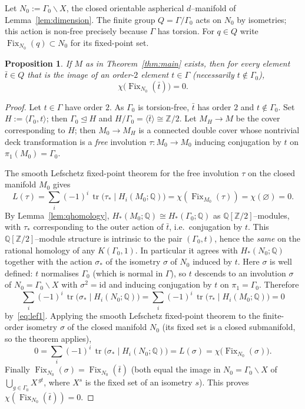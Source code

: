 \documentclass[12pt]{article}
\newcommand{\bQ}{\mathbb{Q}}
\newcommand{\bZ}{\mathbb{Z}}
\newcommand{\Fix}{\operatorname{Fix}}
\DeclareMathOperator{\tr}{tr}
\newtheorem{proposition}{Proposition}
\theoremstyle{definition}
\begin{document}
Let $N_0:=\Gamma_0\backslash X$, the closed orientable aspherical $d$--manifold of
Lemma~\ref{lem:dimension}.  The finite group $Q=\Gamma/\Gamma_0$ acts on $N_0$ by
isometries; this action is non-free precisely because $\Gamma$ has torsion.  For
$q\in Q$ write $\Fix_{N_0}(q)\subset N_0$ for its fixed-point set.

\begin{proposition}\label{prop:lefschetz}
If $M$ as in Theorem~\ref{thm:main} exists, then for every element $\bar t\in Q$
that is the image of an order-$2$ element $t\in\Gamma$ (necessarily
$t\notin\Gamma_0$),
\[
   \chi\bigl(\Fix_{N_0}(\bar t)\bigr)=0 .
\]
\end{proposition}

\begin{proof}
Let $t\in\Gamma$ have order $2$.  As $\Gamma_0$ is torsion-free, $\bar t$ has
order $2$ and $t\notin\Gamma_0$.  Set $H:=\langle\Gamma_0,t\rangle$; then
$\Gamma_0\trianglelefteq H$ and $H/\Gamma_0=\langle\bar t\rangle\cong\bZ/2$.  Let
$M_H\to M$ be the cover corresponding to $H$; then $M_0\to M_H$ is a connected
double cover whose nontrivial deck transformation is a \emph{free} involution
$\tau\colon M_0\to M_0$ inducing conjugation by $t$ on $\pi_1(M_0)=\Gamma_0$.

The smooth Lefschetz fixed-point theorem for the free involution $\tau$ on the
closed manifold $M_0$ gives
\begin{equation}\label{eq:lef1}
   L(\tau)=\sum_i(-1)^i\,\tr\bigl(\tau_*\mid H_i(M_0;\bQ)\bigr)
          =\chi(\Fix_{M_0}(\tau))=\chi(\varnothing)=0 .
\end{equation}
By Lemma~\ref{lem:qhomology}, $H_*(M_0;\bQ)\cong H_*(\Gamma_0;\bQ)$ as
$\bQ[\bZ/2]$--modules, with $\tau_*$ corresponding to the outer action of
$\bar t$, i.e.\ conjugation by $t$.  This $\bQ[\bZ/2]$--module structure is
intrinsic to the pair $(\Gamma_0,t)$, hence the \emph{same} on the rational
homology of any $K(\Gamma_0,1)$.  In particular it agrees with $H_*(N_0;\bQ)$
together with the action $\sigma_*$ of the isometry $\sigma$ of $N_0$ induced by
$t$.  Here $\sigma$ is well defined: $t$ normalises $\Gamma_0$ (which is normal in
$\Gamma$), so $t$ descends to an involution $\sigma$ of $N_0=\Gamma_0\backslash X$
with $\sigma^2=\mathrm{id}$ and inducing conjugation by $t$ on $\pi_1=\Gamma_0$.
Therefore
\[
   \sum_i(-1)^i\,\tr\bigl(\sigma_*\mid H_i(N_0;\bQ)\bigr)
   =\sum_i(-1)^i\,\tr\bigl(\tau_*\mid H_i(M_0;\bQ)\bigr)=0
\]
by~\eqref{eq:lef1}.  Applying the smooth Lefschetz fixed-point theorem to the
finite-order isometry $\sigma$ of the closed manifold $N_0$ (its fixed set is a
closed submanifold, so the theorem applies),
\[
   0=\sum_i(-1)^i\,\tr\bigl(\sigma_*\mid H_i(N_0;\bQ)\bigr)
    =L(\sigma)=\chi\bigl(\Fix_{N_0}(\sigma)\bigr).
\]
Finally $\Fix_{N_0}(\sigma)=\Fix_{N_0}(\bar t)$ (both equal the image in
$N_0=\Gamma_0\backslash X$ of $\bigcup_{g\in\Gamma_0}X^{\,gt}$, where $X^{s}$ is
the fixed set of an isometry $s$).  This proves $\chi(\Fix_{N_0}(\bar t))=0$.
\end{proof}
\end{document}
